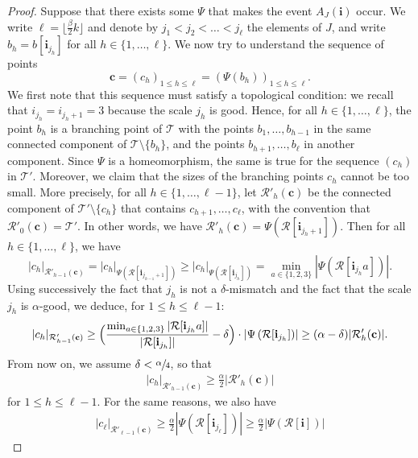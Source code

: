 \documentclass[11pt]{article}
\let\backslash\setminus
\newcommand{\Rr}{\mathcal{R}}
\newcommand{\ii}{\mathbf{i}}
\theoremstyle{plain}
\theoremstyle{definition}
\numberwithin{equation}{section}
\begin{document}
\begin{proof}
Suppose that there exists some $\Psi$ that makes the event $A_J(\ii)$ occur.
We write $\ell=\lfloor \frac{\beta}{2}k \rfloor$ and denote by $j_1 < j_2 < \dots < j_{\ell}$ the elements of $J$, and write $b_h=b[\ii_{j_{h}}]$ for all $h\in\{1,\dots,\ell\}$.
We now try to understand the sequence of points
\[ \mathbf{c}=(c_h)_{1 \leq h \leq \ell} = \left( \Psi(b_h) \right)_{1 \leq h \leq \ell}.\]
We first note that this sequence must satisfy a topological condition: we recall that $i_{j_h}=i_{j_h+1}=3$ because the scale $j_h$ is good. Hence, for all $h\in\{1,\dots,\ell\}$, the point $b_h$ is a branching point of $\mathcal{T}$ with the points $b_1, \dots, b_{h-1}$ in the same connected component of $\mathcal{T} \backslash \{b_h\}$, and the points $b_{h+1}, \dots, b_{\ell}$ in another component.
Since $\Psi$ is a homeomorphism, the same is true for the sequence $(c_h)$ in $\mathcal{T}'$. Moreover, we claim that the sizes of the branching points $c_h$ cannot be too small.
More precisely, for all $h\in\{1,\dots,\ell-1\}$, let $\Rr'_h(\mathbf{c})$ be the connected component of $\mathcal{T}' \backslash \{ c_h\}$ that contains $c_{h+1}, \dots, c_{\ell}$, with the convention that $\Rr'_0(\mathbf{c})=\mathcal{T}'$.
In other words, we have $\Rr'_h(\mathbf{c})=\Psi \left( \Rr[\ii_{j_h+1}] \right)$.
Then for all $h\in\{1,\dots,\ell\}$, we have
\[ |c_h|_{\Rr'_{h-1}(\mathbf{c})} = |c_h|_{\Psi \left( \Rr[\ii_{j_{h-1}+1}]
\right)} \geq |c_h|_{\Psi \left( \Rr[\ii_{j_{h}}] \right)} = \min_{a \in \{1,2,3\}} | \Psi( \Rr[\ii_{j_h} a]) |.\]
Using successively the fact that $j_h$ is not a $\delta$-mismatch and the fact that the scale $j_h$ is $\alpha$-good, we deduce, for $1 \leq h \leq \ell-1$:
\begin{equation}\label{eqn_ci_not_too_small}
|c_h|_{\Rr'_{h-1}(\mathbf{c})} \geq \Bigl( \frac{\min_{a \in \{1,2,3\}} \left| \Rr[\ii_{j_h} a] \right| }{\left| \Rr[\ii_{j_h}] \right|} -\delta \Bigr) \cdot \left| \Psi \left( \Rr[\ii_{j_h}] \right) \right| \geq (\alpha-\delta) | \Rr'_h(\mathbf{c}) |.
\end{equation}
From now on, we assume $\delta<\sfrac{\alpha}{4}$, so that
\begin{align*}
|c_h|_{\Rr'_{h-1}(\mathbf{c})} \geq \frac{\alpha}{2} \left| \Rr'_h(\mathbf{c}) \right|
\end{align*}
for $1 \leq h \leq \ell-1$.
For the same reasons, we also have
\begin{align*}
|c_{\ell}|_{\Rr'_{\ell-1}(\mathbf{c})} \geq \frac{\alpha}{2} \left| \Psi \left( \Rr[\ii_{j_{\ell}}]\right) \right| \geq \frac{\alpha}{2} \left| \Psi \left( \Rr[\ii] \right) \right|

\end{align*}
\end{proof}
\end{document}
